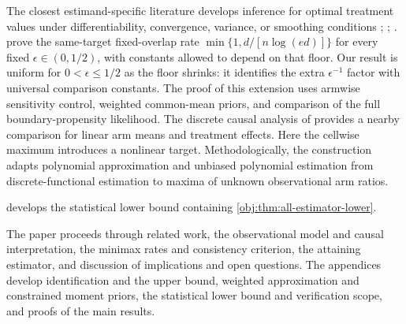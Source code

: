 The closest estimand-specific literature develops inference for optimal treatment values under differentiability, convergence, variance, or smoothing conditions \citep[Theorems~1--2]{LuedtkeVanderLaan2016OptimalValue}; \citep[Theorems~2--3]{Shi2020}; \citep[Theorem~3.3 and Corollary~3.4]{WhitehouseChenAusternSyrgkanis2025}. \citet[Theorem~3]{CausalSmithFixedOverlap2026} prove the same-target fixed-overlap rate \(\min\{1,d/[n\log(ed)]\}\) for every fixed \(\epsilon\in(0,1/2)\), with constants allowed to depend on that floor. Our result is uniform for \(0<\epsilon\le1/2\) as the floor shrinks: it identifies the extra \(\epsilon^{-1}\) factor with universal comparison constants. The proof of this extension uses armwise sensitivity control, weighted common-mean priors, and comparison of the full boundary-propensity likelihood. The discrete causal analysis of \citet[Theorems~1--2]{ZengBalakrishnanHanKennedy2024Discrete} provides a nearby comparison for linear arm means and treatment effects. Here the cellwise maximum introduces a nonlinear target. Methodologically, the construction adapts polynomial approximation and unbiased polynomial estimation from discrete-functional estimation \citep{JiaoVenkatHanWeissman2015Functionals,JiaoHanWeissman2018L1} to maxima of unknown observational arm ratios.

 develops the statistical lower bound containing \cref{obj:thm:all-estimator-lower}.

The paper proceeds through related work, the observational model and causal interpretation, the minimax rates and consistency criterion, the attaining estimator, and discussion of implications and open questions. The appendices develop identification and the upper bound, weighted approximation and constrained moment priors, the statistical lower bound and verification scope, and proofs of the main results.
